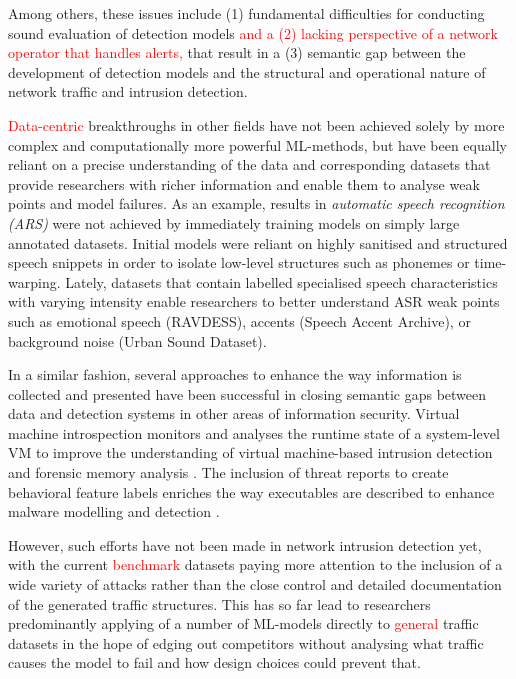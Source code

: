 \documentclass[sigconf]{acmart}
\begin{document}
Among others, these issues include (1) fundamental difficulties for conducting sound evaluation of detection models \textcolor{red}{and a (2) lacking perspective of a network operator that handles alerts,} that result in a (3) semantic gap between the development of detection models and the structural and operational nature of network traffic and intrusion detection. 

\textcolor{red}{Data-centric} breakthroughs in other fields have not been achieved solely by more complex and computationally more powerful ML-methods, but have been equally reliant on a precise understanding of the data and corresponding datasets that provide researchers with richer information and enable them to analyse weak points and model failures. As an example, results in \textit{automatic speech recognition (ARS)} were not achieved by immediately training models on simply large annotated datasets. Initial models were reliant on highly sanitised and structured speech snippets in order to isolate low-level structures such as phonemes or time-warping. Lately, datasets that contain labelled specialised speech characteristics with varying intensity enable researchers to better understand ASR weak points such as emotional speech (RAVDESS), accents (Speech Accent Archive), or background noise (Urban Sound Dataset).



In a similar fashion, several approaches to enhance the way information is collected and presented have been successful in closing semantic gaps between data and detection systems in other areas of information security. Virtual machine introspection monitors and analyses the runtime state of a system-level VM to improve the understanding of virtual machine-based intrusion detection and forensic memory analysis \cite{dolan2011virtuoso}. The inclusion of threat reports to create behavioral feature labels enriches the way executables are described to enhance malware modelling and detection \cite{smith2020mind}.

However, such efforts have not been made in network intrusion detection yet, with the current \textcolor{red}{benchmark} datasets paying more attention to the inclusion of a wide variety of attacks rather than the close control and detailed documentation of the generated traffic structures. This has so far lead to researchers predominantly applying of a number of ML-models directly to \textcolor{red}{general} traffic datasets in the hope of edging out competitors without analysing what traffic causes the model to fail and how design choices could prevent that.
\end{document}
